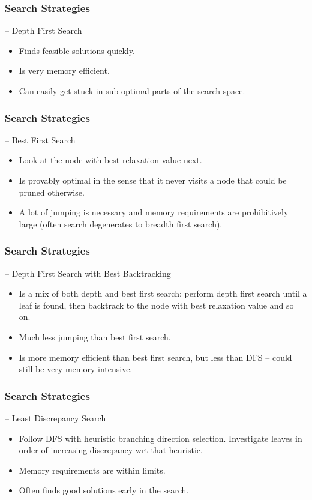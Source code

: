 \documentclass{beamer}
\begin{document}
\begin{frame}
	\frametitle{Search Strategies}
	
	– Depth First Search
	\begin{itemize}
		\item Finds feasible solutions quickly.
		\item Is very memory efficient.
		\item Can easily get stuck in sub-optimal parts of the
		search space.
	\end{itemize}
\end{frame}
\begin{frame}
	\frametitle{Search Strategies}
	– Best First Search
	\begin{itemize}
		\item Look at the node with best relaxation value next.
		\item Is provably optimal in the sense that it never visits a
		node that could be pruned otherwise.
		\item A lot of jumping is necessary and memory
		requirements are prohibitively large (often search
		degenerates to breadth first search).
	\end{itemize}
\end{frame}
\begin{frame}
	\frametitle{Search Strategies}
	– Depth First Search with Best Backtracking
	\begin{itemize}
		\item Is a mix of both depth and best first search: perform depth first
		search until a leaf is found, then backtrack to the node with best
		relaxation value and so on.
		\item Much less jumping than best first search.
		\item Is more memory efficient than best first search, but less than
		DFS – could still be very memory intensive.
	\end{itemize}
\end{frame}
\begin{frame}
	\frametitle{Search Strategies}
	
	– Least Discrepancy Search
	\begin{itemize}
		\item Follow DFS with heuristic branching direction selection.
		Investigate leaves in order of increasing discrepancy wrt that
		heuristic.
		\item Memory requirements are within limits.
		\item Often finds good solutions early in the search.
	\end{itemize}
\end{frame}
\end{document}
